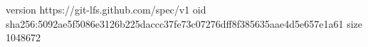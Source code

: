version https://git-lfs.github.com/spec/v1
oid sha256:5092ae5f5086e3126b225daccc37fe73c07276dff8f385635aae4d5e657e1a61
size 1048672
